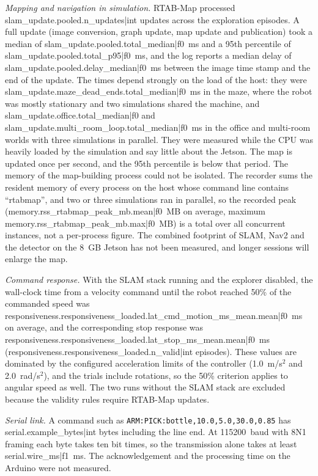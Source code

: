 \noindent\textit{Mapping and navigation in simulation.} RTAB-Map processed {{slam_update.pooled.n_updates|int}} updates across the exploration episodes. A full update (image conversion, graph update, map update and publication) took a median of {{slam_update.pooled.total_median|f0}}~ms and a 95th percentile of {{slam_update.pooled.total_p95|f0}}~ms, and the log reports a median delay of {{slam_update.pooled.delay_median|f0}}~ms between the image time stamp and the end of the update. The times depend strongly on the load of the host: they were {{slam_update.maze_dead_ends.total_median|f0}}~ms in the maze, where the robot was mostly stationary and two simulations shared the machine, and {{slam_update.office.total_median|f0}} and {{slam_update.multi_room_loop.total_median|f0}}~ms in the office and multi-room worlds with three simulations in parallel. They were measured while the CPU was heavily loaded by the simulation and say little about the Jetson. The map is updated once per second, and the 95th percentile is below that period. The memory of the map-building process could not be isolated. The recorder sums the resident memory of every process on the host whose command line contains ``rtabmap'', and two or three simulations ran in parallel, so the recorded peak ({{memory.rss_rtabmap_peak_mb.mean|f0}}~MB on average, maximum {{memory.rss_rtabmap_peak_mb.max|f0}}~MB) is a total over all concurrent instances, not a per-process figure. The combined footprint of SLAM, Nav2 and the detector on the 8~GB Jetson has not been measured, and longer sessions will enlarge the map.

\noindent\textit{Command response.} With the SLAM stack running and the explorer disabled, the wall-clock time from a velocity command until the robot reached 50\% of the commanded speed was {{responsiveness.responsiveness_loaded.lat_cmd_motion_ms_mean.mean|f0}}~ms on average, and the corresponding stop response was {{responsiveness.responsiveness_loaded.lat_stop_ms_mean.mean|f0}}~ms ({{responsiveness.responsiveness_loaded.n_valid|int}} episodes). These values are dominated by the configured acceleration limits of the controller (1.0~m/s$^2$ and 2.0~rad/s$^2$), and the trials include rotations, so the 50\% criterion applies to angular speed as well. The two runs without the SLAM stack are excluded because the validity rules require RTAB-Map updates.

\noindent\textit{Serial link.} A command such as \texttt{ARM:PICK:bottle,10.0,5.0,30.0,0.85} has {{serial.example_bytes|int}} bytes including the line end. At 115200~baud with 8N1 framing each byte takes ten bit times, so the transmission alone takes at least {{serial.wire_ms|f1}}~ms. The acknowledgement and the processing time on the Arduino were not measured.

